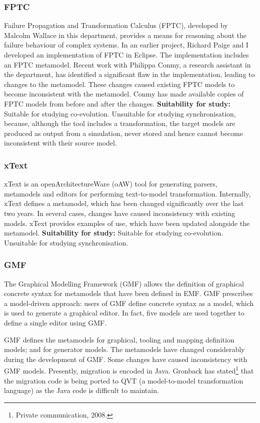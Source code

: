 \subsubsection{FPTC}
Failure Propagation and Transformation Calculus (FPTC), developed by Malcolm Wallace in this department, provides a means for reasoning about the failure behaviour of complex systems. In an earlier project, Richard Paige and I developed an implementation of FPTC in Eclipse. The implementation includes an FPTC metamodel. Recent work with Philippa Conmy, a research assistant in the department, has identified a significant flaw in the implementation, leading to changes to the metamodel. These changes caused existing FPTC models to become inconsistent with the metamodel. Conmy has made available copies of FPTC models from before and after the changes. \textbf{Suitability for study:} Suitable for studying co-evolution. Unsuitable for studying synchronisation, because, although the tool includes a transformation, the target models are produced as output from a simulation, never stored and hence cannot become inconsistent with their source model.

\subsubsection{xText}
xText is an openArchitectureWare (oAW) \cite{oaw} tool for generating parsers, metamodels and editors for performing text-to-model transformation. Internally, xText defines a metamodel, which has been changed significantly over the last two years. In several cases, changes have caused inconsistency with existing models. xText provides examples of use, which have been updated alongside the metamodel. \textbf{Suitability for study:} Suitable for studying co-evolution. Unsuitable for studying synchronisation.

\subsubsection{GMF}
The Graphical Modelling Framework (GMF) \cite{gronback09emp} allows the definition of graphical concrete syntax for metamodels that have been defined in EMF. GMF prescribes a model-driven approach: users of GMF define concrete syntax as a model, which is used to generate a graphical editor. In fact, five models are used together to define a single editor using GMF.

GMF defines the metamodels for graphical, tooling and mapping definition models; and for generator models. The metamodels have changed considerably during the development of GMF. Some changes have caused inconsistency with GMF models. Presently, migration is encoded in Java. Gronback has stated\footnote{Private communication, 2008.} that the migration code is being ported to QVT (a model-to-model transformation language) as the Java code is difficult to maintain.

